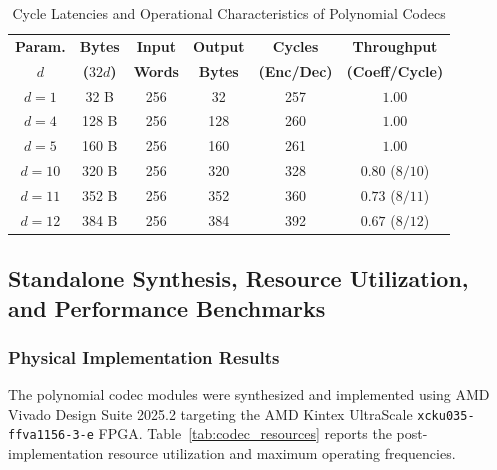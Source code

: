 \begin{table}[htbp]
\caption{Cycle Latencies and Operational Characteristics of Polynomial Codecs}
\label{tab:codec_latencies}
\centering
\footnotesize
\setlength{\tabcolsep}{2.5pt}
\begin{tabular*}{\columnwidth}{@{\extracolsep{\fill}} cccccc @{}}
\toprule
\textbf{Param.} & \textbf{Bytes} & \textbf{Input} & \textbf{Output} & \textbf{Cycles} & \textbf{Throughput} \\
$d$ & \textbf{($32d$)} & \textbf{Words} & \textbf{Bytes} & \textbf{(Enc/Dec)} & \textbf{(Coeff/Cycle)} \\
\midrule
$d = 1$  & 32 B  & 256 & 32  & 257 & $1.00$ \\
$d = 4$  & 128 B & 256 & 128 & 260 & $1.00$ \\
$d = 5$  & 160 B & 256 & 160 & 261 & $1.00$ \\
$d = 10$ & 320 B & 256 & 320 & 328 & $0.80$ ($8/10$) \\
$d = 11$ & 352 B & 256 & 352 & 360 & $0.73$ ($8/11$) \\
$d = 12$ & 384 B & 256 & 384 & 392 & $0.67$ ($8/12$) \\
\bottomrule
\end{tabular*}
\end{table}

\subsection{Standalone Synthesis, Resource Utilization, and Performance Benchmarks}
\label{sec:codecs_synthesis_benchmarks}

\subsubsection{Physical Implementation Results}
The polynomial codec modules were synthesized and implemented using AMD Vivado Design Suite 2025.2 targeting the AMD Kintex UltraScale \texttt{xcku035-ffva1156-3-e} FPGA. Table~\ref{tab:codec_resources} reports the post-implementation resource utilization and maximum operating frequencies.

